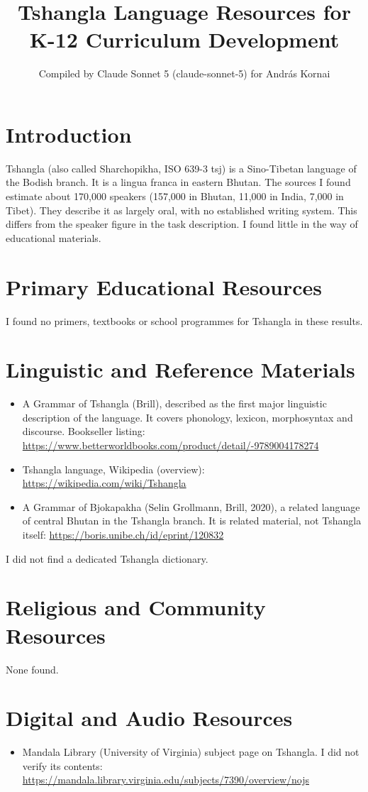 \documentclass[12pt]{article}
\title{Tshangla Language Resources for K-12 Curriculum Development}
\author{Compiled by Claude Sonnet 5 (claude-sonnet-5) for Andr\'as Kornai}
\date{}
\begin{document}
\maketitle

\section{Introduction}
Tshangla (also called Sharchopikha, ISO 639-3 tsj) is a Sino-Tibetan language of the Bodish branch. It is a lingua franca in eastern Bhutan. The sources I found estimate about 170,000 speakers (157,000 in Bhutan, 11,000 in India, 7,000 in Tibet). They describe it as largely oral, with no established writing system. This differs from the speaker figure in the task description. I found little in the way of educational materials.

\section{Primary Educational Resources}
I found no primers, textbooks or school programmes for Tshangla in these results.

\section{Linguistic and Reference Materials}
\begin{itemize}
\item A Grammar of Tshangla (Brill), described as the first major linguistic description of the language. It covers phonology, lexicon, morphosyntax and discourse. Bookseller listing: \url{https://www.betterworldbooks.com/product/detail/-9789004178274}
\item Tshangla language, Wikipedia (overview): \url{https://wikipedia.com/wiki/Tshangla}
\item A Grammar of Bjokapakha (Selin Grollmann, Brill, 2020), a related language of central Bhutan in the Tshangla branch. It is related material, not Tshangla itself: \url{https://boris.unibe.ch/id/eprint/120832}
\end{itemize}
I did not find a dedicated Tshangla dictionary.

\section{Religious and Community Resources}
None found.

\section{Digital and Audio Resources}
\begin{itemize}
\item Mandala Library (University of Virginia) subject page on Tshangla. I did not verify its contents: \url{https://mandala.library.virginia.edu/subjects/7390/overview/nojs}
\end{itemize}
\end{document}
